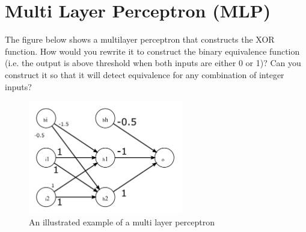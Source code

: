 \documentclass{article}           %
\begin{document}
\section{Multi Layer Perceptron (MLP)}
The figure below shows a multilayer perceptron that constructs the XOR function.
How would you rewrite it to construct the binary equivalence function
(i.e. the output is above threshold when both inputs are either 0 or 1)? Can
you construct it so that it will detect equivalence for any combination of integer
inputs?

\begin{figure}[H]
\begin{center}
\includegraphics[width=0.6\textwidth]{fig2.png}
\caption{An illustrated example of a multi layer perceptron}
\label{fig:mlp}
\end{center}
\end{figure}


\end{document}

